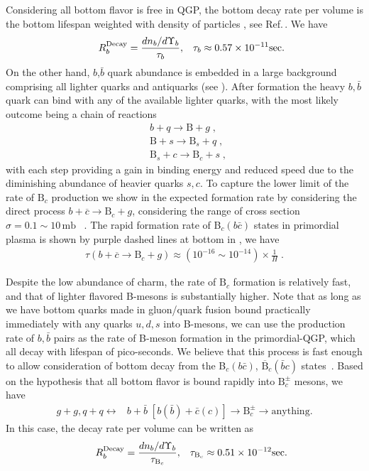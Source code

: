 Considering all bottom flavor is free in QGP, the bottom decay rate per volume is the bottom lifespan weighted with density of particles , see Ref.\,\cite{Kuznetsova:2008jt}. We have
\begin{align}\hspace{0.5cm}
R^{\mathrm{Decay}}_b=\frac{dn_b/d\Upsilon_b}{\tau_b},\,\,\,\,\, \tau_b\approx0.57\times10^{-11} \mathrm{sec}.
\end{align}
On the other hand, $b$,$\bar b$ quark abundance is embedded in a large background comprising all lighter quarks and antiquarks (see ). After formation the heavy $b, \bar b$ quark can bind with any of the available lighter quarks, with the most likely outcome being a chain of reactions 
\begin{align}
&b+q\longrightarrow\mathrm{B}+g\;,\\
&\mathrm{B}+s\longrightarrow\mathrm{B}_s+q\;,\\
&\mathrm{B}_s+c\longrightarrow\mathrm{B}_c+s\;,
\end{align}
with each step providing a gain in binding energy and reduced speed due to the diminishing abundance of heavier quarks $s, c$. To capture the lower limit of the rate of $\mathrm{B}_c$ production we show in  the expected formation rate by considering the direct process $b+\overline c\rightarrow \mathrm{B}_c+g$, considering the range of cross section $\sigma=0.1\sim10\,\mathrm{mb}$ ~\cite{Schroedter:2000ek}. The rapid formation rate of B$_c(b\bar c)$ states in primordial plasma is shown by purple dashed lines at bottom in , we have
\begin{align}
\tau (b+\overline c\rightarrow \mathrm{B}_c+g)\approx(10^{-16}\sim10^{-14})\times\frac{1}{H} \;.
\end{align}

Despite the low abundance of charm, the rate of $\mathrm{B}_c$ formation is relatively fast, and that of lighter flavored B-mesons is substantially higher. Note that as long as we have bottom quarks made in gluon/quark fusion bound practically immediately with any quarks $u, d, s$ into B-mesons, we can use the production rate of $b, \bar b$ pairs as the rate of B-meson formation in the primordial-QGP, which all decay with lifespan of pico-seconds. We believe that this process is fast enough to allow consideration of bottom decay from the B$_c(b\bar c)$, $\overline{\mathrm{B}}_c(\bar b c)$ states~\cite{Yang:2020nne}.  
 Based on the hypothesis that all bottom flavor is bound rapidly into $\mathrm{B}_c^\pm$ mesons, we have 
\begin{align}\label{Bc_source}
g+g, q+q \longleftrightarrow &b+\bar b\;[b(\bar{b})+\bar{c}(c)]\longrightarrow \mathrm{B}_c^\pm\longrightarrow\mathrm{anything}.
\end{align}
In this case, the decay rate per volume can be written as
\begin{align}\hspace{0.5cm}
 R^{\mathrm{Decay}}_b=\frac{dn_b/d\Upsilon_b}{\tau_{\mathrm{B}_c}},\,\,\,\,\, \tau_{\mathrm{B}_c}\approx0.51\times10^{-12} \mathrm{sec}.
 \end{align}

